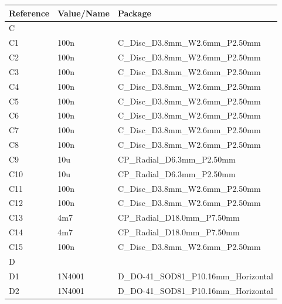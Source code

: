 \documentclass[paper=a4, open=any]{scrbook}
\begin{document}
				\begin{longtabu}
					to \textwidth[l]{lX[-1]X}
					Reference & Value/Name             & Package                                                 \\ \hline\hline
					\endhead
					C         &                        &                                                         \\*
					C1        & 100n                   & C\_Disc\_D3.8mm\_W2.6mm\_P2.50mm                        \\
					C2        & 100n                   & C\_Disc\_D3.8mm\_W2.6mm\_P2.50mm                        \\
					C3        & 100n                   & C\_Disc\_D3.8mm\_W2.6mm\_P2.50mm                        \\
					C4        & 100n                   & C\_Disc\_D3.8mm\_W2.6mm\_P2.50mm                        \\
					C5        & 100n                   & C\_Disc\_D3.8mm\_W2.6mm\_P2.50mm                        \\
					C6        & 100n                   & C\_Disc\_D3.8mm\_W2.6mm\_P2.50mm                        \\
					C7        & 100n                   & C\_Disc\_D3.8mm\_W2.6mm\_P2.50mm                        \\
					C8        & 100n                   & C\_Disc\_D3.8mm\_W2.6mm\_P2.50mm                        \\
					C9        & 10u                    & CP\_Radial\_D6.3mm\_P2.50mm                             \\
					C10       & 10u                    & CP\_Radial\_D6.3mm\_P2.50mm                             \\
					C11       & 100n                   & C\_Disc\_D3.8mm\_W2.6mm\_P2.50mm                        \\
					C12       & 100n                   & C\_Disc\_D3.8mm\_W2.6mm\_P2.50mm                        \\
					C13       & 4m7                    & CP\_Radial\_D18.0mm\_P7.50mm                            \\
					C14       & 4m7                    & CP\_Radial\_D18.0mm\_P7.50mm                            \\
					C15       & 100n                   & C\_Disc\_D3.8mm\_W2.6mm\_P2.50mm                        \\
					\hline

					D         &                        &                                                         \\*
					D1        & 1N4001                 & D\_DO-41\_SOD81\_P10.16mm\_Horizontal                   \\
					D2        & 1N4001                 & D\_DO-41\_SOD81\_P10.16mm\_Horizontal                   \\
					\hline


\end{longtabu}
\end{document}
